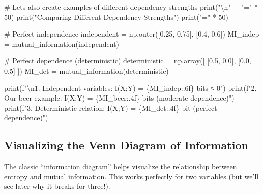 \documentclass[
  11pt,
  letterpaper,
  oneside,
  openany]{book}
\newenvironment{Shaded}{\begin{snugshade}}{\end{snugshade}}
\newcommand{\BuiltInTok}[1]{\textcolor[rgb]{0.00,0.23,0.31}{#1}}
\newcommand{\CharTok}[1]{\textcolor[rgb]{0.13,0.47,0.30}{#1}}
\newcommand{\CommentTok}[1]{\textcolor[rgb]{0.37,0.37,0.37}{#1}}
\newcommand{\DecValTok}[1]{\textcolor[rgb]{0.68,0.00,0.00}{#1}}
\newcommand{\FloatTok}[1]{\textcolor[rgb]{0.68,0.00,0.00}{#1}}
\newcommand{\NormalTok}[1]{\textcolor[rgb]{0.00,0.23,0.31}{#1}}
\newcommand{\OperatorTok}[1]{\textcolor[rgb]{0.37,0.37,0.37}{#1}}
\newcommand{\SpecialCharTok}[1]{\textcolor[rgb]{0.37,0.37,0.37}{#1}}
\newcommand{\SpecialStringTok}[1]{\textcolor[rgb]{0.13,0.47,0.30}{#1}}
\newcommand{\StringTok}[1]{\textcolor[rgb]{0.13,0.47,0.30}{#1}}
\begin{document}
\begin{Shaded}
\begin{Highlighting}[]
\CommentTok{\# Let\textquotesingle{}s also create examples of different dependency strengths}
\BuiltInTok{print}\NormalTok{(}\StringTok{"}\CharTok{\textbackslash{}n}\StringTok{"} \OperatorTok{+} \StringTok{"="} \OperatorTok{*} \DecValTok{50}\NormalTok{)}
\BuiltInTok{print}\NormalTok{(}\StringTok{"Comparing Different Dependency Strengths"}\NormalTok{)}
\BuiltInTok{print}\NormalTok{(}\StringTok{"="} \OperatorTok{*} \DecValTok{50}\NormalTok{)}

\CommentTok{\# Perfect independence}
\NormalTok{independent }\OperatorTok{=}\NormalTok{ np.outer([}\FloatTok{0.25}\NormalTok{, }\FloatTok{0.75}\NormalTok{], [}\FloatTok{0.4}\NormalTok{, }\FloatTok{0.6}\NormalTok{])}
\NormalTok{MI\_indep }\OperatorTok{=}\NormalTok{ mutual\_information(independent)}

\CommentTok{\# Perfect dependence (deterministic)}
\NormalTok{deterministic }\OperatorTok{=}\NormalTok{ np.array([}
\NormalTok{    [}\FloatTok{0.5}\NormalTok{, }\FloatTok{0.0}\NormalTok{],}
\NormalTok{    [}\FloatTok{0.0}\NormalTok{, }\FloatTok{0.5}\NormalTok{]}
\NormalTok{])}
\NormalTok{MI\_det }\OperatorTok{=}\NormalTok{ mutual\_information(deterministic)}

\BuiltInTok{print}\NormalTok{(}\SpecialStringTok{f"}\CharTok{\textbackslash{}n}\SpecialStringTok{1. Independent variables: I(X;Y) = }\SpecialCharTok{\{}\NormalTok{MI\_indep}\SpecialCharTok{:.6f\}}\SpecialStringTok{ bits ≈ 0"}\NormalTok{)}
\BuiltInTok{print}\NormalTok{(}\SpecialStringTok{f"2. Our beer example: I(X;Y) = }\SpecialCharTok{\{}\NormalTok{MI\_beer}\SpecialCharTok{:.4f\}}\SpecialStringTok{ bits (moderate dependence)"}\NormalTok{)}
\BuiltInTok{print}\NormalTok{(}\SpecialStringTok{f"3. Deterministic relation: I(X;Y) = }\SpecialCharTok{\{}\NormalTok{MI\_det}\SpecialCharTok{:.4f\}}\SpecialStringTok{ bit (perfect dependence)"}\NormalTok{)}
\end{Highlighting}
\end{Shaded}

\subsection{Visualizing the Venn Diagram of
Information}\label{visualizing-the-venn-diagram-of-information}

The classic ``information diagram'' helps visualize the relationship
between entropy and mutual information. This works perfectly for two
variables (but we'll see later why it breaks for three!).
\end{document}
